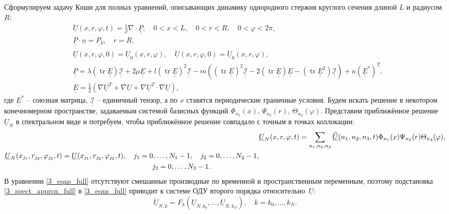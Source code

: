 \documentclass[12pt, a4paper]{report}
\DeclareMathOperator{\trace}{tr}
\newcommand{\lb}{\left (}
\newcommand{\rb}{\right )}
\newcommand{\vect}[1]{\underline{#1}}
\newcommand{\tens}[1]{\underline{\underline{#1}}}
\begin{document}
Сформулируем задачу Коши для полных уравнений, описывающих динамику однородного стержня круглого сечения длиной $L$ и радиусом $R$:
\begin{align}
\label{3_eqns_full}
&\ddot{\vect{U}}(x, r, \varphi, t) = \frac1\rho \nabla\cdot\tens{P},\quad 0<x<L, \quad 0<r<R,\quad 0<\varphi<2\pi,\\
\label{3_bc_full}
&\tens{P} \cdot \vect{n} = \vect{P_b}, \quad r = R,\\
\label{3_iv_full}
&\vect{U}(x,r,\varphi,0) = \vect{U}_0(x,r,\varphi), \quad \vect{\dot U}(x,r,\varphi,0) = \vect{\dot U}_0(x,r,\varphi),\\
\label{3_stress}
&\tens{P} = \lambda \lb\trace{\tens{E}}\rb \tens{\mathcal{I}} + 2\mu \tens{E} + l \lb\trace{\tens{E}}\rb^2 \tens{\mathcal{I}} - m\lb \lb\trace{\tens{E}}\rb^2\tens{\mathcal{I}} - 2\lb\trace{\tens{E}}\rb\tens{E} - \lb\trace{\tens{E}^2}\rb\tens{\mathcal{I}}\rb + n\lb\tens{E}^*\rb^T,\\
\label{3_strain}
&\tens{E} = \frac12 \lb \nabla\vect{U}^T + \nabla\vect{U} + \nabla\vect{U}^T \cdot \nabla\vect{U} \rb,
\end{align}
где $\tens{E}^*$ -- союзная матрица, $\tens{\mathcal{I}}$ -- единичный тензор, а по $x$ ставятся периодические граничные условия.
Будем искать решение в некотором конечномерном пространстве, задаваемым системой базисных функций $\Phi_{n_1}(x)$, $\Psi_{n_2}(r)$, $\Theta_{n_3}(\varphi)$. 
Представим приближённое решение %
$\vect{U}_{N}$ в спектральном виде и потребуем, чтобы приближённое решение совпадало с точным в точках коллокации:
\begin{align}
\label{3_spect_approx_full}
&\vect{U}_{N}(x,r,\varphi,t) = \sum_{n_1,n_2,n_3} \vect{\widehat{U}}(n_1,n_2,n_3,t) \Phi_{n_1}(x) \Psi_{n_2}(r) \Theta_{n_3}(\varphi),\\
\label{3_pseudo_sp_approx_full}
\begin{split}
&\vect{U}_{N}(x_{j_1}, r_{j_2}, \varphi_{j_3}, t) = \vect{U}(x_{j_1}, r_{j_2}, \varphi_{j_3}, t), \quad j_1 = 0,\dots, N_1-1, \quad j_2 = 0,\dots, N_2-1,\\
&\hspace{72.5mm} j_3 = 0,\dots, N_3-1.
\end{split}
\end{align}
В уравнении \eqref{3_eqns_full} отсутствуют смешанные производные по временной и пространственным переменным, поэтому подстановка \eqref{3_spect_approx_full} в \eqref{3_eqns_full} приводит к системе ОДУ второго порядка относительно~$\vect{U}$:
\begin{equation}\label{3_ode_inner}
\vect{\ddot{U}}_{N,k} = F_{k}(\vect{U}_{N,k_0}, \dots, \vect{U}_{N,k_N}), \quad k = k_0, \dots, k_N.
\end{equation}
\end{document}
